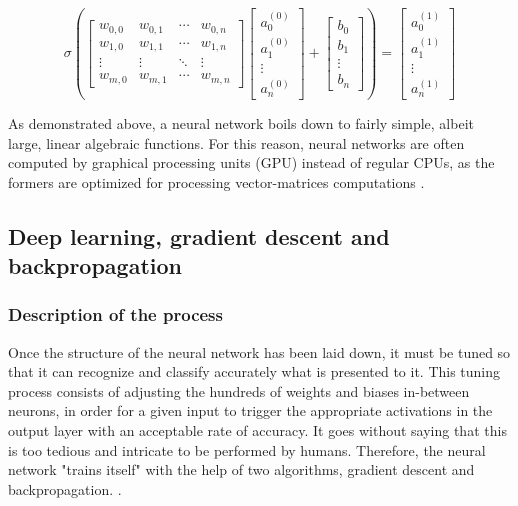 \documentclass[12pt,a4paper,notitlepage]{article}
\begin{document}
\begin{displaymath}
	\sigma
	\left(
	\begin{bmatrix}
		w_{0,0} & w_{0,1} & \cdots & w_{0,n}\\
		w_{1,0} & w_{1,1} & \cdots & w_{1,n}\\
		\vdots & \vdots & \ddots & \vdots\\
		w_{m,0} & w_{m,1} & \cdots & w_{m,n}
	\end{bmatrix}
	\begin{bmatrix}
		a_{0}^{(0)}\\
		a_{1}^{(0)}\\
		\vdots\\
		a_{n}^{(0)}
	\end{bmatrix}
	+
	\begin{bmatrix}
		b_{0}\\
		b_{1}\\
		\vdots\\
		b_{n}
	\end{bmatrix}
	\right)
	=
	\begin{bmatrix}
		a_{0}^{(1)}\\
		a_{1}^{(1)}\\
		\vdots\\
		a_{n}^{(1)}
	\end{bmatrix}
\end{displaymath}

As demonstrated above, a neural network boils down to fairly simple, albeit large, linear algebraic functions. For this reason, neural networks are often computed by graphical processing units (GPU) instead of regular CPUs, as the formers are optimized for processing vector-matrices computations \cite{salter_cart_2021}.

\subsection{Deep learning, gradient descent and backpropagation}\label{deep-learning}
\subsubsection{Description of the process}
Once the structure of the neural network has been laid down, it must be tuned so that it can recognize and classify accurately what is presented to it. This tuning process consists of adjusting the hundreds of weights and biases in-between neurons, in order for a given input to trigger the appropriate activations in the output layer with an acceptable rate of accuracy. It goes without saying that this is too tedious and intricate to be performed by humans. Therefore, the neural network "trains itself" with the help of two algorithms, gradient descent and backpropagation. \cite{ibm_cloud_education_what_2020}.
\end{document}
